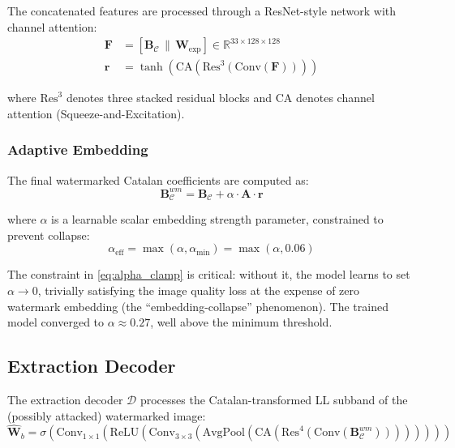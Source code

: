\documentclass[journal]{IEEEtran}
\begin{document}
The concatenated features are processed through a ResNet-style network
with channel attention:
\begin{align}
  \mathbf{F} &= [\mathbf{B}_{\mathcal{C}}\,\|\,\mathbf{W}_{\text{exp}}]
  \in \mathbb{R}^{33 \times 128 \times 128} \label{eq:concat}\\
  \mathbf{r} &= \tanh\!\left(\text{CA}(\text{Res}^3(\text{Conv}(\mathbf{F})))\right)
  \label{eq:residual}
\end{align}

where $\text{Res}^3$ denotes three stacked residual blocks and
$\text{CA}$ denotes channel attention (Squeeze-and-Excitation).

\subsubsection{Adaptive Embedding}

The final watermarked Catalan coefficients are computed as:
\begin{equation}
  \mathbf{B}_{\mathcal{C}}^{wm} = \mathbf{B}_{\mathcal{C}} +
  \alpha \cdot \mathbf{A} \cdot \mathbf{r}
  \label{eq:embed}
\end{equation}

where $\alpha$ is a learnable scalar embedding strength parameter,
constrained to prevent collapse:
\begin{equation}
  \alpha_{\text{eff}} = \max(\alpha, \alpha_{\min}) = \max(\alpha, 0.06)
  \label{eq:alpha_clamp}
\end{equation}

The constraint in \eqref{eq:alpha_clamp} is critical: without it, the
model learns to set $\alpha \to 0$, trivially satisfying the image quality
loss at the expense of zero watermark embedding (the ``embedding-collapse''
phenomenon). The trained model converged to $\alpha \approx 0.27$,
well above the minimum threshold.

\subsection{Extraction Decoder}

The extraction decoder $\mathcal{D}$ processes the Catalan-transformed LL
subband of the (possibly attacked) watermarked image:
\begin{equation}
  \hat{\mathbf{W}}_b = \sigma\!\left(
    \text{Conv}_{1\times1}(\text{ReLU}(\text{Conv}_{3\times3}(
      \text{AvgPool}(\text{CA}(\text{Res}^4(\text{Conv}(\mathbf{B}_{\mathcal{C}}^{wm})))))))
  \right)
  \label{eq:decoder}
\end{equation}
\end{document}
